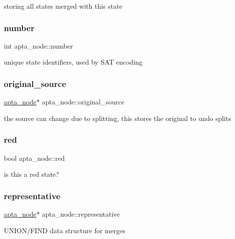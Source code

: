 storing all states merged with this state \mbox{\label{classapta__node_aa4d8ad2056671f1e14ddb4123ac6f87e}} 
\subsubsection{\texorpdfstring{number}{number}}
{\footnotesize\ttfamily int apta\+\_\+node\+::number}

unique state identifiers, used by S\+AT encoding \mbox{\label{classapta__node_ad5fecd3dc4b9dfba4e68cf05af5ab34b}} 
\subsubsection{\texorpdfstring{original\+\_\+source}{original\_source}}
{\footnotesize\ttfamily \hyperlink{classapta__node}{apta\+\_\+node}$\ast$ apta\+\_\+node\+::original\+\_\+source}

the source can change due to splitting, this stores the original to undo splits \mbox{\label{classapta__node_ab5e461390057947fba0c8ec64b7fd57a}} 
\subsubsection{\texorpdfstring{red}{red}}
{\footnotesize\ttfamily bool apta\+\_\+node\+::red}

is this a red state? \mbox{\label{classapta__node_aaa89817381036872082c939d9c3e0094}} 
\subsubsection{\texorpdfstring{representative}{representative}}
{\footnotesize\ttfamily \hyperlink{classapta__node}{apta\+\_\+node}$\ast$ apta\+\_\+node\+::representative}

U\+N\+I\+O\+N/\+F\+I\+ND data structure for merges \mbox{\label{classapta__node_a24c9dae152b759bb6a2ebcae6bbc36d5}} 
